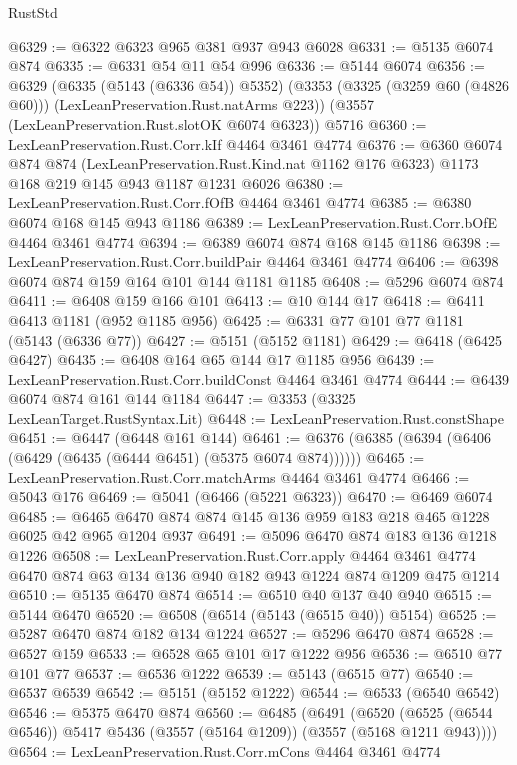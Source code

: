 \begin{lexlean}{RustStd}
\begin{coremodule}
@6329 := @6322 @6323 @965 @381 @937 @943 @6028
@6331 := @5135 @6074 @874
@6335 := @6331 @54 @11 @54 @996
@6336 := @5144 @6074
@6356 := @6329
    (@6335 (@5143 (@6336 @54)) @5352)
    (@3353 (@3325 (@3259 @60 (@4826 @60))) (LexLeanPreservation.Rust.natArms @223))
    (@3557 (LexLeanPreservation.Rust.slotOK @6074 @6323))
    @5716
@6360 := LexLeanPreservation.Rust.Corr.kIf @4464 @3461 @4774
@6376 := @6360
    @6074
    @874
    @874
    (LexLeanPreservation.Rust.Kind.nat @1162 @176 @6323)
    @1173
    @168
    @219
    @145
    @943
    @1187
    @1231
    @6026
@6380 := LexLeanPreservation.Rust.Corr.fOfB @4464 @3461 @4774
@6385 := @6380 @6074 @168 @145 @943 @1186
@6389 := LexLeanPreservation.Rust.Corr.bOfE @4464 @3461 @4774
@6394 := @6389 @6074 @874 @168 @145 @1186
@6398 := LexLeanPreservation.Rust.Corr.buildPair @4464 @3461 @4774
@6406 := @6398 @6074 @874 @159 @164 @101 @144 @1181 @1185
@6408 := @5296 @6074 @874
@6411 := @6408 @159 @166 @101
@6413 := @10 @144 @17
@6418 := @6411 @6413 @1181 (@952 @1185 @956)
@6425 := @6331 @77 @101 @77 @1181 (@5143 (@6336 @77))
@6427 := @5151 (@5152 @1181)
@6429 := @6418 (@6425 @6427)
@6435 := @6408 @164 @65 @144 @17 @1185 @956
@6439 := LexLeanPreservation.Rust.Corr.buildConst @4464 @3461 @4774
@6444 := @6439 @6074 @874 @161 @144 @1184
@6447 := @3353 (@3325 LexLeanTarget.RustSyntax.Lit)
@6448 := LexLeanPreservation.Rust.constShape
@6451 := @6447 (@6448 @161 @144)
@6461 := @6376 (@6385 (@6394 (@6406 (@6429 (@6435 (@6444 @6451) (@5375 @6074 @874))))))
@6465 := LexLeanPreservation.Rust.Corr.matchArms @4464 @3461 @4774
@6466 := @5043 @176
@6469 := @5041 (@6466 (@5221 @6323))
@6470 := @6469 @6074
@6485 := @6465 @6470 @874 @874 @145 @136 @959 @183 @218 @465 @1228 @6025 @42 @965 @1204 @937
@6491 := @5096 @6470 @874 @183 @136 @1218 @1226
@6508 := LexLeanPreservation.Rust.Corr.apply
    @4464
    @3461
    @4774
    @6470
    @874
    @63
    @134
    @136
    @940
    @182
    @943
    @1224
    @874
    @1209
    @475
    @1214
@6510 := @5135 @6470 @874
@6514 := @6510 @40 @137 @40 @940
@6515 := @5144 @6470
@6520 := @6508 (@6514 (@5143 (@6515 @40)) @5154)
@6525 := @5287 @6470 @874 @182 @134 @1224
@6527 := @5296 @6470 @874
@6528 := @6527 @159
@6533 := @6528 @65 @101 @17 @1222 @956
@6536 := @6510 @77 @101 @77
@6537 := @6536 @1222
@6539 := @5143 (@6515 @77)
@6540 := @6537 @6539
@6542 := @5151 (@5152 @1222)
@6544 := @6533 (@6540 @6542)
@6546 := @5375 @6470 @874
@6560 := @6485
    (@6491
      (@6520 (@6525 (@6544 @6546)) @5417 @5436 (@3557 (@5164 @1209)) (@3557 (@5168 @1211 @943))))
@6564 := LexLeanPreservation.Rust.Corr.mCons @4464 @3461 @4774

\end{coremodule}
\end{lexlean}
